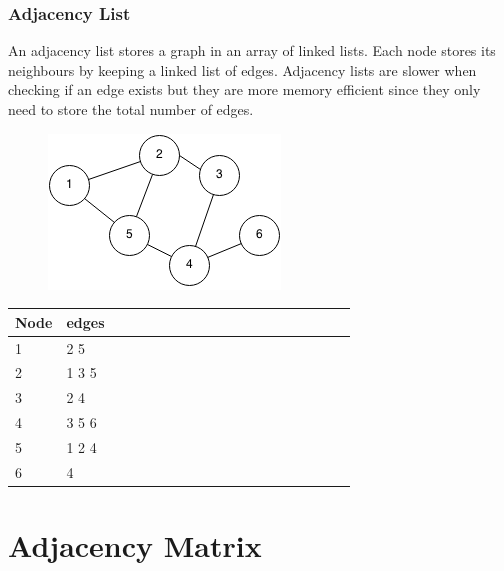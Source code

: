 \documentclass[11pt,oneside]{book}
\makeatletter
\def\maxwidth#1{\ifdim\Gin@nat@width>#1 #1\else\Gin@nat@width\fi}
\makeatother
\begin{document}
\subsubsection{Adjacency List}



An adjacency list stores a graph in an array of linked lists. Each node stores its neighbours by keeping a linked list of edges. Adjacency lists are slower when checking if an edge exists but they are more memory efficient since they only need to store the total number of edges.

\vspace{5px}\begin{figure}[H]\centering
        \includegraphics[width=0.66\maxwidth{\textwidth}]{graph.png}
        \end{figure}

\vspace{10px}\begin{tabulary}{0.4\linewidth}{|l|l|l|l|l|l|l|l|l|l|l|l|l|l|l|l|l|l|l}\hline


  Node &
  edges\\
\hline


  1 &
  2 5\\

  2 &
  1 3 5\\

  3 &
  2 4\\

  4 &
  3 5 6\\

  5 &
  1 2 4\\

  6 &
  4\\

\hline\end{tabulary}



        \section{ Adjacency Matrix }
        
\end{document}
